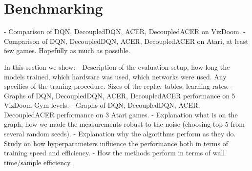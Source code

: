 \section{Benchmarking}

- Comparison of DQN, DecoupledDQN, ACER, DecoupledACER on VizDoom.
- Comparison of DQN, DecoupledDQN, ACER, DecoupledACER on Atari, at least few
  games. Hopefully as much as possible.

In this section we show:
- Description of the evaluation setup, how long the models trained, which hardware was used,
which networks were used. Any specifics of the traning procedure. Sizes of the replay tables,
learning rates.
- Graphs of DQN, DecoupledDQN, ACER, DecoupledACER performance on 5 VizDoom Gym levels.
- Graphs of DQN, DecoupledDQN, ACER, DecoupledACER performance on 3 Atari games.
- Explanation what is on the graph, how we made the measurements robust to the noise (choosing top 5
from several random seeds).
- Explanation why the algorithms perform as they do. Study on how hyperparameters influence
the performance both in terms of training speed and efficiency.
- How the methods perform in terms of wall time/sample efficiency.
